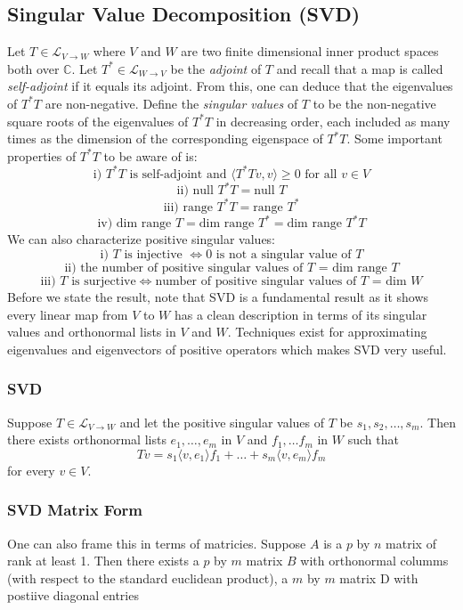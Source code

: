 \documentclass{article}
\begin{document}
\subsection{Singular Value Decomposition (SVD)}
Let $T \in \mathcal{L}_{V \to W}$ where $V$ and $W$ are two finite dimensional inner product spaces both over $\mathbb{C}$. Let $T^* \in \mathcal{L}_{W \to V}$ be the \emph{adjoint} of $T$ and recall that a map is called \emph{self-adjoint} 
if it equals its adjoint. From this, one can deduce that the eigenvalues of $T^*T$ are non-negative. \newline \newline 
Define the \emph{singular values} of $T$ to be the non-negative square roots of the eigenvalues of $T^*T$ in decreasing order, 
each included as many times as the dimension of the corresponding eigenspace of $T^*T$. Some important properties of $T^*T$ to be aware of is: 
$$
\text{i) }T^*T \text{ is self-adjoint and } \langle T^*Tv,v\rangle\geq 0 \text{ for all }v \in V
$$
$$
\text{ii) null } T^*T = \text{null } T
$$
$$
\text{iii) range }T^*T= \text{range }T^*
$$
$$
\text{iv) dim range }T = \text{dim range }T^* = \text{dim range }T^*T
$$
\newline \newline
We can also characterize positive singular values:
$$
\text{i) }T \text{ is injective } \iff \text{0 is not a singular value of }T
$$
$$
\text{ii) the number of positive singular values of $T$ = dim range }T  
$$
$$
\text{iii) }T \text{ is surjective} \iff \text{number of positive singular values of $T$ = dim }W
$$
\newline \newline
Before we state the result, note that SVD is a fundamental result as it shows every linear map from $V$ to $W$ has a clean description in terms of its singular values
and orthonormal lists in $V$ and $W$. Techniques exist for approximating eigenvalues and eigenvectors of positive operators which makes SVD very useful.
\subsubsection{SVD}
Suppose $T \in \mathcal{L}_{V \to W}$ and let the positive singular values of $T$ be $s_1, s_2, \ldots, s_m$. Then there exists 
orthonormal lists $e_1, \ldots, e_m$ in $V$ and $f_1, \ldots f_m$ in $W$ such that 
$$
Tv = s_1\langle v,e_1\rangle f_1+ \ldots + s_m \langle v,e_m\rangle f_m
$$
for every $v \in V$. 
\subsubsection{SVD Matrix Form}
One can also frame this in terms of matricies. Suppose $A$ is a $p$ by $n$ matrix of rank at least 1. Then there exists a $p$ by $m$ matrix $B$ with orthonormal columms 
(with respect to the standard euclidean product), a $m$ by $m$ matrix D with postiive diagonal entries 
\end{document}
